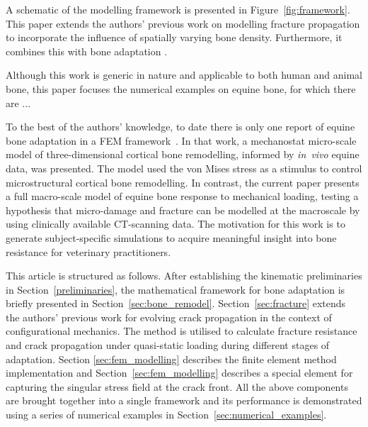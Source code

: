 \documentclass[review]{elsarticle}
\numberwithin{equation}{section}
\begin{document}
A schematic of the modelling framework is presented in Figure~\ref{fig:framework}. This paper extends the authors' previous work on modelling fracture propagation \citep{kaczmarczyk2014three,kaczmarczyk2017energy} to incorporate the influence of spatially varying bone density. Furthermore, it combines this with bone adaptation \citep{kaczmarczyk2011efficient,lewandowski2017}. 

Although this work is generic in nature and applicable to both human and animal bone, this paper focuses the numerical examples on equine bone, for which there are ...

To the best of the authors' knowledge, to date there is only one report of equine bone adaptation in a FEM framework~\citep{Wang2016}. 
In that work, a mechanostat micro-scale model of three-dimensional cortical bone remodelling, informed by \emph{in~vivo} equine data, was presented. 
The model used the von Mises stress as a stimulus to control microstructural cortical bone remodelling.
In contrast, the current paper presents a full macro-scale model of equine bone response to mechanical loading, testing a hypothesis that micro-damage and fracture can be modelled at the macroscale by using clinically available CT-scanning data.
The motivation for this work is to generate subject-specific simulations to acquire meaningful insight into bone resistance
 for veterinary practitioners.

This article is structured as follows. After establishing the kinematic preliminaries in Section~\ref{preliminaries}, the mathematical framework for bone adaptation is briefly presented in Section~\ref{sec:bone_remodel}. Section~\ref{sec:fracture} extends the authors' previous work for evolving crack propagation in the context of configurational mechanics. The method is utilised to calculate fracture resistance and crack propagation under quasi-static loading during different stages of adaptation. Section \ref{sec:fem_modelling} describes the finite element method implementation and Section~\ref{sec:fem_modelling} describes a special element for capturing the singular stress field at the crack front.  
All the above components are brought together into a single framework and its performance is demonstrated using a series of numerical examples in Section~\ref{sec:numerical_examples}.
\end{document}
